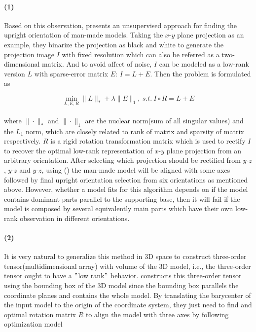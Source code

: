 \paragraph{(1)}Based on this observation, \cite{jin2012unsupervised} presents an unsupervised approach for finding the upright orientation of man-made models. Taking the $x$-$y$ plane projection as an example, they binarize the projection as black and white to generate the projection image $I$ with fixed resolution which can also be referred as a two-dimensional matrix. And to avoid affect of noise, $I$ can be modeled as a low-rank version $L$ with sparse-error matrix $E$: $I=L+E$. Then the problem is formulated as

\small{
\begin{equation}
 \label{eq:UprightJin}
 \min_{L,E,R}\|L\|_{*}+\lambda\|E\|_{1},~s.t.~I\circ R=L+E
\end{equation}
}
\\
where $\|\cdot\|_{*}$ and $\|\cdot\|_1$ are the nuclear norm(sum of all singular values) and the $L_1$ norm, which are closely related to rank of matrix and sparsity of matrix respectively. $R$ is a rigid rotation transformation matrix which is used to rectify $I$ to recover the optimal low-rank representation of $x$-$y$ plane projection from an arbitrary orientation. After selecting which projection should be rectified from $y$-$z$, $y$-$z$ and $y$-$z$, using () the man-made model will be aligned with some axes followed by final upright orientation selection from six orientations as mentioned above. However, whether a model fits for this algorithm depends on if the model contains dominant parts parallel to the supporting base, then it will fail if the model is composed by several equivalently main parts which have their own low-rank observation in different orientations.%

\paragraph{(2)}It is very natural to generalize this method in 3D space to construct three-order tensor(multidimensional array) with volume of the 3D model, i.e., the three-order tensor ought to have a $"$low rank$"$ behavior. \cite{wang2014upright} constructs this three-order tensor using the bounding box of the 3D model since the bounding box parallels the coordinate planes and contains the whole model. By translating the barycenter of the input model to the origin of the coordinate system, they just need to find and optimal rotation matrix $R$ to align the model with three axes by following optimization model

